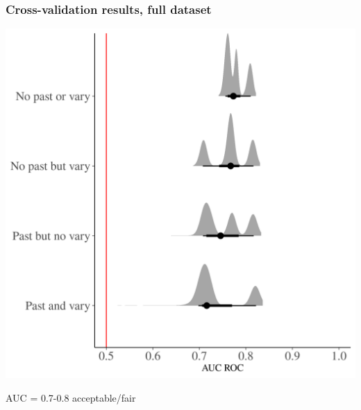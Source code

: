 \documentclass{beamer}
\begin{document}
\begin{frame}
  \frametitle{Cross-validation results, full dataset}

  \begin{center}
    \includegraphics[width=\textwidth,height=0.8\textheight,keepaspectratio=true]{../results/figure/fold_auc_zoom}

    \footnotesize{AUC = 0.7-0.8 acceptable/fair}
  \end{center}

\end{frame}
\end{document}
